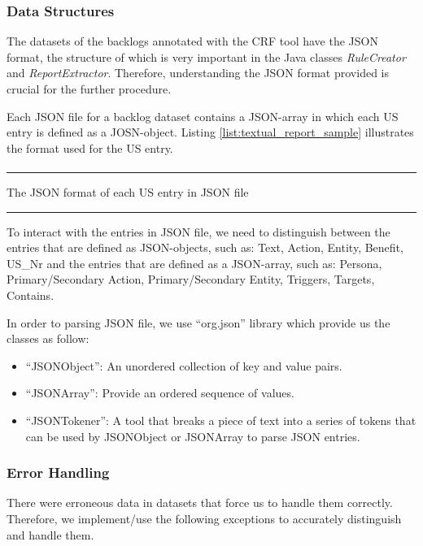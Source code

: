 \subsubsection*{Data Structures}
The datasets of the backlogs annotated with the CRF tool have the JSON format, the structure of which is very important in the Java classes \textit{RuleCreator} and \textit{ReportExtractor}. Therefore, understanding the JSON format provided is crucial for the further procedure.

Each JSON file for a backlog dataset contains a JSON-array in which each US entry is defined as a JOSN-object. Listing \ref{list:textual_report_sample} illustrates the format used for the US entry.
\begin{MyListing}
	\paragraph{}
	\hrule
	\centering
	
	\caption{The JSON format of each US entry in JSON file}\label{list:textual_report_sample}
	\hrule
\end{MyListing}
To interact with the entries in JSON file, we need to distinguish between the entries that are defined as JSON-objects, such as: {Text, Action, Entity, Benefit, US\_Nr} and the entries that are defined as a JSON-array, such as: {Persona, Primary/Secondary Action, Primary/Secondary Entity, Triggers, Targets, Contains}.

In order to parsing JSON file, we use \enquote{org.json} library which provide us the classes as follow:
\begin{itemize}
	\item \enquote{JSONObject}: An unordered collection of key and value pairs.
	\item \enquote{JSONArray}: Provide an ordered sequence of values.
	 \item \enquote{JSONTokener}: A tool that breaks a piece of text into a series of tokens that can be used by JSONObject or JSONArray to parse JSON entries.
\end{itemize}
\subsubsection*{Error Handling}
There were erroneous data in datasets that force us to handle them correctly. Therefore, we implement/use the following exceptions to accurately distinguish and handle them.


